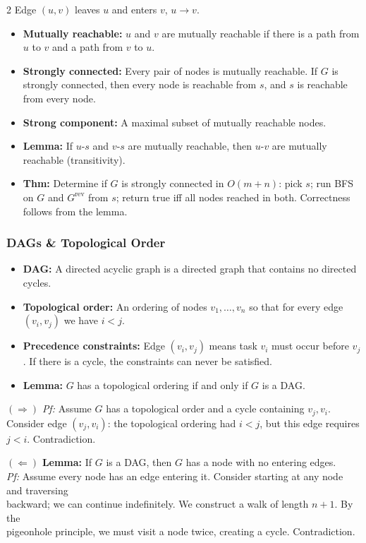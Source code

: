 \documentclass[9pt]{article}
\begin{document}
\begin{multicols}{2}
Edge $(u,v)$ leaves $u$ and enters $v$, $u\to v$.
\begin{itemize}
  \item \textbf{Mutually reachable:} $u$ and $v$ are mutually reachable if there is a path from $u$ to $v$ and a path from $v$ to $u$.
  \item \textbf{Strongly connected:} Every pair of nodes is mutually reachable. If $G$ is strongly connected, then every node is reachable from $s$, and $s$ is reachable from every node.
  \item \textbf{Strong component:} A maximal subset of mutually reachable nodes.
  \item \textbf{Lemma:} If $u$-$s$ and $v$-$s$ are mutually reachable, then $u$-$v$ are mutually reachable (transitivity).
  \item \textbf{Thm:} Determine if $G$ is strongly connected in $O(m+n)$: pick $s$; run BFS on $G$ and $G^{\mathrm{rev}}$ from $s$; return true iff all nodes reached in both. Correctness follows from the lemma.
\end{itemize}

\subsubsection*{DAGs \& Topological Order}

\begin{itemize}
  \item \textbf{DAG:} A directed acyclic graph is a directed graph that contains no directed cycles.
  \item \textbf{Topological order:} An ordering of nodes $v_1,\dots,v_n$ so that for every edge $(v_i,v_j)$ we have $i<j$.
  \item \textbf{Precedence constraints:} Edge $(v_i,v_j)$ means task $v_i$ must occur before $v_j$. If there is a cycle, the constraints can never be satisfied.
  \item \textbf{Lemma:} $G$ has a topological ordering if and only if $G$ is a DAG.
\end{itemize}

$(\Rightarrow)$ \textit{Pf:} Assume $G$ has a topological order and a cycle containing $v_j,v_i$. Consider edge $(v_j,v_i)$: the topological ordering had $i<j$, but this edge requires $j<i$. Contradiction.

$(\Leftarrow)$ \textbf{Lemma:} If $G$ is a DAG, then $G$ has a node with no entering edges.\\
\hspace*{8pt}\textit{Pf:} Assume every node has an edge entering it. Consider starting at any node and traversing\\
\hspace*{8pt}backward; we can continue indefinitely. We construct a walk of length $n+1$. By the\\
\hspace*{8pt}pigeonhole principle, we must visit a node twice, creating a cycle. Contradiction.


\end{multicols}
\end{document}
